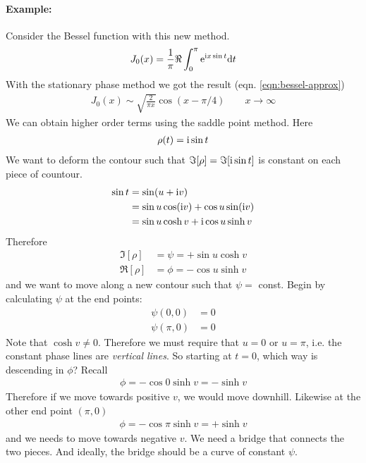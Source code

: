 \paragraph{Example:} Consider the Bessel function with this new method. 
\begin{align*}
	J_0(x) = \frac{1}{\pi} \Re \int_{0}^{\pi} \mathrm{e}^{\mathrm{i} x \sin t} \mathrm{d} t
\end{align*}
With the stationary phase method we got the result (eqn. \ref{eqn:bessel-approx})
\begin{gather*}
	J_0(x) \sim \sqrt{\frac{2}{\pi x}} \cos \left(x - \pi/4\right) \qquad x \rightarrow \infty
\end{gather*}
We can obtain higher order terms using the saddle point method. Here
\begin{gather*}
	\rho(t) = \mathrm{i} \sin t 
\end{gather*}
We want to deform the contour such that $\Im [\rho] = \Im [\mathrm{i} \sin t]$ is constant on each piece of countour.
\begin{align*}
	\sin t &= \sin (u + \mathrm{i} v) \\
			& = \sin u \cos (\mathrm{i} v) + \cos u \sin (\mathrm{i} v) \\
			&= \sin u \cosh v + \mathrm{i} \cos u \sinh v
\end{align*}
Therefore
\begin{align*}
	\Im[\rho] &= \psi = + \sin u \cosh v \\
	\Re[\rho] &= \phi = - \cos u \sinh v
\end{align*}
and we want to move along a new contour such that $\psi =$ const. Begin by calculating $\psi$ at the end points:
\begin{align*}
	\psi (0,0) &= 0 \\
	\psi (\pi,0) &= 0 
\end{align*}
Note that $\cosh v \neq 0$. Therefore we must require that $u =0$ or $u = \pi$, i.e. the constant phase lines are \emph{vertical lines}. So starting at $t=0$, which way is descending in $\phi$? Recall 
\begin{gather*}
	\phi = -\cos 0 \sinh v = -\sinh v
\end{gather*}
Therefore if we move towards positive $v$, we would move downhill. Likewise at the other end point $(\pi,0)$
\begin{gather*}
	\phi = -\cos \pi \sinh v = +\sinh v
\end{gather*}
and we needs to move towards negative $v$. We need a bridge that connects the two pieces. And ideally, the bridge should be a curve of constant $\psi$. 
